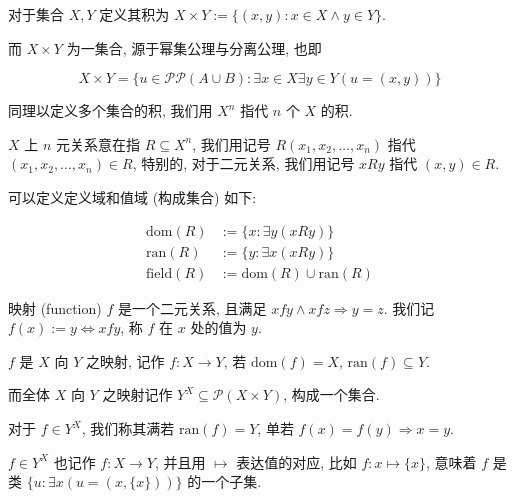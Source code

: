 \begin{definition}
    对于集合 \(X,Y\) 定义其积为 \(X \times Y := \{(x,y) : x \in X \wedge y \in Y\}\).

    而 \(X \times Y\) 为一集合, 源于幂集公理与分离公理, 也即

    \[
        X \times Y = \{u \in \mathcal{P} \mathcal{P} (A \cup B) : \exists x \in X \exists y \in Y (u = (x,y))\}
    \]

    同理以定义多个集合的积, 我们用 \(X^n\) 指代 \(n\) 个 \(X\) 的积.
\end{definition}

\begin{definition}
    \(X\) 上 \(n\) 元关系意在指 \(R \subseteq X^n\), 我们用记号 \(R(x_1,x_2,\dots,x_n)\)
    指代 \((x_1,x_2,\dots,x_n) \in R\), 特别的, 对于二元关系, 我们用记号 \(xRy\) 指代 \((x,y) \in R\).

    可以定义定义域和值域 (构成集合) 如下:

    \begin{align}
        \mathrm{dom}(R) &:= \{x : \exists y (xRy)\} \\
        \mathrm{ran}(R) &:= \{y : \exists x (xRy)\} \\
        \mathrm{field}(R) &:= \mathrm{dom}(R) \cup \mathrm{ran}(R)
    \end{align}
\end{definition}

\begin{definition}
    映射 (function) \(f\) 是一个二元关系, 且满足 \(x f y \wedge x f z \Rightarrow y = z\).
    我们记 \(f(x) := y \Leftrightarrow x f y\), 称 \(f\) 在 \(x\) 处的值为 \(y\).

    \(f\) 是 \(X\) 向 \(Y\) 之映射, 记作 \(f : X \to Y\), 若 \(\mathrm{dom}(f) = X\), \(\mathrm{ran}(f) \subseteq Y\).

    而全体 \(X\) 向 \(Y\) 之映射记作 \(Y^X \subseteq \mathcal{P} (X \times Y)\), 构成一个集合.

    对于 \(f \in Y^X\), 我们称其满若 \(\mathrm{ran} (f) = Y\), 单若 \(f(x) = f(y) \Rightarrow x = y\).

    \(f \in Y^X\) 也记作 \(f : X \to Y\), 并且用 \(\mapsto\) 表达值的对应, 比如 \(f : x \mapsto \{x\}\), 意味着 \(f\) 是类 \(\{u:\exists x(u=(x, \{x\}))\}\) 的一个子集.
\end{definition}

